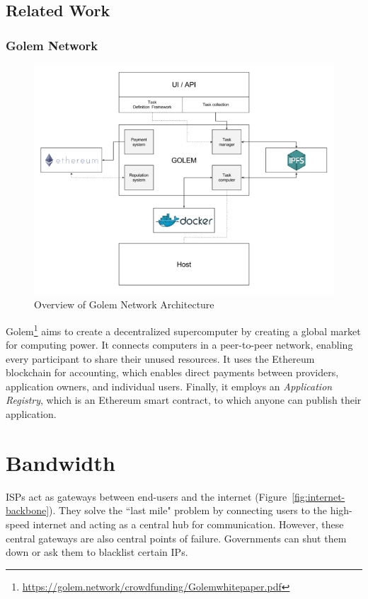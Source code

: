 	\subsection{Related Work}
		\subsubsection{Golem Network}
		\begin{figure}[h]
			\centering
			\includegraphics[width=\linewidth]{figures/golem-network}
			\caption{\label{fig:golem-network} Overview of Golem Network Architecture\protect\footnotemark}
		\end{figure}
		
		Golem\footnote{\url{https://golem.network/crowdfunding/Golemwhitepaper.pdf}} aims to create a decentralized supercomputer by creating a global market for computing power. It connects computers in a peer-to-peer network, enabling every participant to share their unused resources. It uses the Ethereum blockchain for accounting, which enables direct payments between providers, application owners, and individual users. Finally, it employs an \textit{Application Registry}, which is an Ethereum smart contract, to which anyone can publish their application.
	
\section{Bandwidth}
	ISPs act as gateways between end-users and the internet (Figure~\ref{fig:internet-backbone}). They solve the ``last mile" problem by connecting users to the high-speed internet and acting as a central hub for communication. However, these central gateways are also central points of failure. Governments can shut them down or ask them to blacklist certain IPs\cite{raval2016decentralized}.
	
